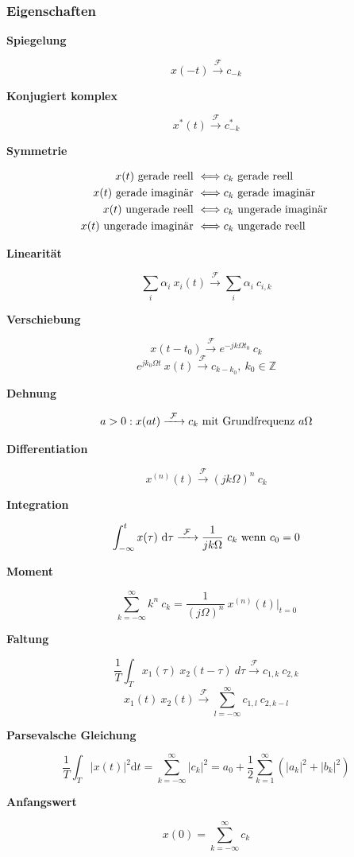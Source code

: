 \documentclass[10pt,a4paper]{article}
\newcommand{\fancyformula}[2]{
	\small
	\raggedright\sffamily\textbf{#1}
	#2
}
\newcommand{\ftransform}{
	\xrightarrow{~\mathcal{F}~}
}
\begin{document}
\subsubsection*{Eigenschaften}
\begin{multicols}{2}
\fancyformula{Spiegelung}{
	\[ x(-t)  \ftransform c_{-k} \]
}

\fancyformula{Konjugiert komplex}{
	\[ x^*(t)  \ftransform c^*_{-k} \]
}

\fancyformula{Symmetrie}{
 \begin{align*}
	x(t) \textnormal{ gerade reell } &\Longleftrightarrow c_k \textnormal{ gerade reell } \\
	x(t) \textnormal{ gerade imaginär } &\Longleftrightarrow c_k \textnormal{ gerade imaginär } \\
	x(t) \textnormal{ ungerade reell } &\Longleftrightarrow c_k \textnormal{ ungerade imaginär } \\
	x(t) \textnormal{ ungerade imaginär } &\Longleftrightarrow c_k \textnormal{ ungerade reell }
\end{align*}
}

\fancyformula{Linearität}{
	\[ \sum_i \alpha_i ~ x_i(t) \ftransform \sum_i \alpha_i ~ c_{i, k} \]
}

\fancyformula{Verschiebung}{
	\[ x(t - t_0) \ftransform e^{-jk\Omega t_0} ~ c_k \]
	\[ e^{jk_0\Omega t} ~ x(t) \ftransform c_{k-k_0}, ~ k_0 \in \mathbb Z \]
}

\fancyformula{Dehnung}{
	\[ a > 0: x(at) \ftransform c_k \textnormal{ mit Grundfrequenz } a\Omega \]
}

\fancyformula{Differentiation}{
	\[ x^{(n)}(t) \ftransform (jk\Omega)^n ~ c_k \]
}

\fancyformula{Integration}{
	\[ \int_{-\infty}^t x(\tau) ~ \mathrm d\tau \ftransform \frac{1}{jk\Omega} ~ c_k \textnormal{ wenn } c_0 = 0 \]
}

\fancyformula{Moment}{
	\[ \sum_{k=-\infty}^\infty k^n ~ c_k = \frac{1}{(j\Omega)^n} ~ x^{(n)}(t) \bigg|_{t=0} \]
}

\fancyformula{Faltung}{
	\[ \frac{1}{T} \int_T x_1(\tau) ~ x_2(t - \tau) \mathrm ~ d\tau \ftransform c_{1,k} ~ c_{2, k} \]
	\[ x_1(t) ~ x_2(t) \ftransform \sum_{l=-\infty}^{\infty} c_{1, l} ~ c_{2, k - l} \]
}

\fancyformula{Parsevalsche Gleichung}{
	\[ \frac{1}{T} \int_T |x(t)|^2 \mathrm dt = \sum_{k = -\infty}^{\infty} |c_k|^2 = a_0 + \frac{1}{2} \sum_{k=1}^{\infty} \left(|a_k|^2 + |b_k|^2 \right) \]
}
\fancyformula{Anfangswert}{
	\[ x(0) = \sum_{k=-\infty}^{\infty} c_k \]
}
\end{multicols}
\end{document}
